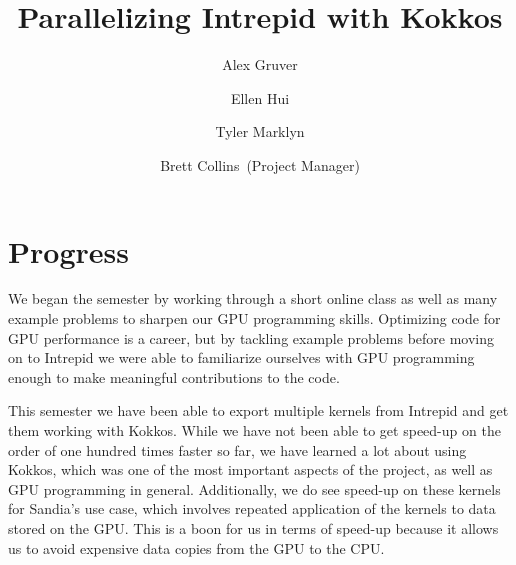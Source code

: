 \documentclass{hmcclinic}
\title{Parallelizing Intrepid with Kokkos}
\author{Alex Gruver \and Ellen Hui \and Tyler Marklyn \and Brett Collins~(Project Manager)}
\begin{document}





\maketitle

\mainmatter




\section*{Progress}
We began the semester by working through a short online class as well as many example
problems to sharpen our GPU programming skills. Optimizing code for GPU
performance is a career, but by tackling example problems before moving on to
Intrepid we were able to familiarize ourselves with GPU programming enough to
make meaningful contributions to the code.

This semester we have been able to export multiple kernels from Intrepid and get
them working with Kokkos. While we have not been able to get speed-up on the
order of one hundred times faster so far, we have learned a lot about using
Kokkos, which was one of the most important aspects of the project, as well as
GPU programming in general. Additionally, we do see speed-up on these kernels
for Sandia's use case, which involves repeated application of the kernels to
data stored on the GPU. This is a boon for us in terms of speed-up because it
allows us to avoid expensive data copies from the GPU to the CPU.
\end{document}

